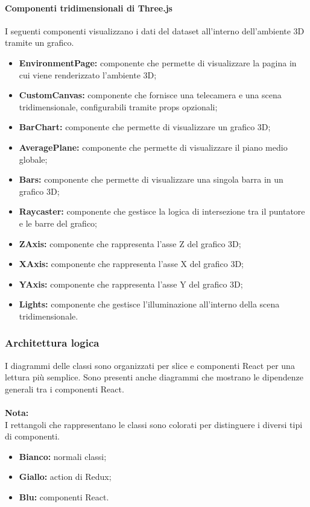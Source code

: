 \paragraph{Componenti tridimensionali di Three.js}
    I seguenti componenti visualizzano i dati del dataset all'interno dell'ambiente 3D tramite un grafico.
    \begin{itemize}
        \item \textbf{EnvironmentPage:} componente che permette di visualizzare la pagina in cui viene renderizzato l'ambiente 3D;
        \item \textbf{CustomCanvas:} componente che fornisce una telecamera e una scena tridimensionale, configurabili tramite props opzionali;
        \item \textbf{BarChart:} componente che permette di visualizzare un grafico 3D;
        \item \textbf{AveragePlane:} componente che permette di visualizzare il piano medio globale;
        \item \textbf{Bars:} componente che permette di visualizzare una singola barra in un grafico 3D;
        \item \textbf{Raycaster:} componente che gestisce la logica di intersezione tra il puntatore e le barre del grafico;
        \item \textbf{ZAxis:} componente che rappresenta l'asse Z del grafico 3D;
        \item \textbf{XAxis:} componente che rappresenta l'asse X del grafico 3D;
        \item \textbf{YAxis:} componente che rappresenta l'asse Y del grafico 3D;
        \item \textbf{Lights:} componente che gestisce l'illuminazione all'interno della scena tridimensionale.
    \end{itemize}

\pagebreak

\subsubsection{Architettura logica}
I diagrammi delle classi sono organizzati per slice e componenti React per una lettura più semplice. 
Sono presenti anche diagrammi che mostrano le dipendenze generali tra i componenti React.\\\\
\textbf{Nota:}\\
I rettangoli che rappresentano le classi sono colorati per distinguere i diversi tipi di componenti.
\begin{itemize}
    \item \textbf{Bianco:} normali classi;
    \item \textbf{Giallo:} action di Redux;
    \item \textbf{Blu:} componenti React.
\end{itemize}

